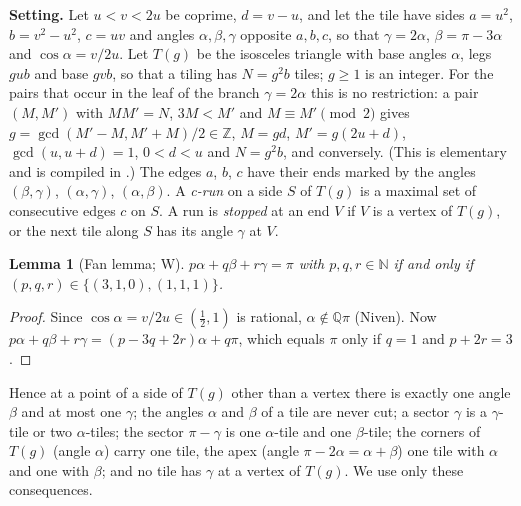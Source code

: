 \documentclass[11pt,reqno]{amsart}
\theoremstyle{plain}
\newtheorem{lemma}[theorem]{Lemma}
\theoremstyle{definition}
\newcommand{\Z}{\mathbb{Z}}
\newcommand{\Q}{\mathbb{Q}}
\newcommand{\N}{\mathbb{N}}
\newcommand{\sW}{\textup{\textsf{W}}}
\begin{document}
\medskip\noindent\textbf{Setting.} Let $u<v<2u$ be coprime, $d=v-u$, and let the tile have sides $a=u^2$, $b=v^2-u^2$,
$c=uv$ and angles $\alpha,\beta,\gamma$ opposite $a,b,c$, so that $\gamma=2\alpha$, $\beta=\pi-3\alpha$ and
$\cos\alpha=v/2u$. Let $T(g)$ be the isosceles triangle with base angles $\alpha$, legs $gub$ and base $gvb$, so that a tiling has
$N=g^2b$ tiles; $g\ge1$ is an integer. For the pairs that occur in the leaf of the branch $\gamma=2\alpha$ this is no
restriction: a pair $(M,M')$ with $MM'=N$, $3M<M'$ and $M\equiv M'\pmod 2$ gives $g=\gcd(M'-M,M'+M)/2\in\Z$,
$M=gd$, $M'=g(2u+d)$, $\gcd(u,u+d)=1$, $0<d<u$ and $N=g^2b$, and conversely. (This is elementary and is compiled in .) The edges $a$, $b$, $c$ have their ends marked by the angles
$(\beta,\gamma)$, $(\alpha,\gamma)$, $(\alpha,\beta)$. A \emph{c-run} on a side $S$ of $T(g)$ is a maximal set of consecutive
edges $c$ on $S$. A run is \emph{stopped} at an end $V$ if $V$ is a vertex of $T(g)$, or the next tile along $S$ has its angle $\gamma$ at $V$.

\begin{lemma}[Fan lemma; \sW]\label{lem:fan}
$p\alpha+q\beta+r\gamma=\pi$ with $p,q,r\in\N$ if and only if $(p,q,r)\in\{(3,1,0),(1,1,1)\}$.
\end{lemma}
\begin{proof}
Since $\cos\alpha=v/2u\in(\tfrac12,1)$ is rational, $\alpha\notin\Q\pi$ (Niven). Now $p\alpha+q\beta+r\gamma=
(p-3q+2r)\alpha+q\pi$, which equals $\pi$ only if $q=1$ and $p+2r=3$.
\end{proof}
Hence at a point of a side of $T(g)$ other than a vertex there is exactly one angle $\beta$ and at most one $\gamma$; the
angles $\alpha$ and $\beta$ of a tile are never cut; a sector $\gamma$ is a $\gamma$-tile or two $\alpha$-tiles; the sector
$\pi-\gamma$ is one $\alpha$-tile and one $\beta$-tile; the corners of $T(g)$ (angle $\alpha$) carry one tile, the apex (angle
$\pi-2\alpha=\alpha+\beta$) one tile with $\alpha$ and one with $\beta$; and no tile has $\gamma$ at a vertex of $T(g)$. We
use only these consequences.
\end{document}
